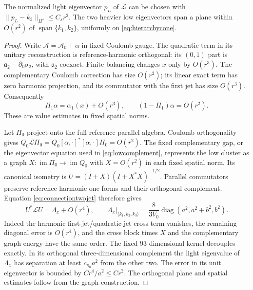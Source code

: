 \begin{lemma}\label{lem:lightdirection}
The normalized light eigenvector $p_L$ of $\mathcal L$ can be chosen with
$\|p_L-k_3\|_{H^s}\le C_s r^2$. The two heavier low eigenvectors span
a plane within $O(r^2)$ of $\operatorname{span}\{k_1,k_2\}$, uniformly
on \eqref{eq:hierarchycone}.
\end{lemma}
\begin{proof}
Write $\mathcal A=\mathcal A_0+\alpha$ in fixed Coulomb gauge. The
quadratic term in its unitary reconstruction is reference-harmonic
orthogonal: its $(0,1)$ part is $\mathfrak a_2-\bar\partial_0\sigma_2$,
with $\mathfrak a_2$ coexact. Finite balancing changes $x$ only by
$O(r^3)$. The complementary Coulomb correction has size $O(r^2)$;
its linear exact term has zero harmonic projection, and its commutator
with the first jet has size $O(r^3)$. Consequently
\begin{equation}\label{eq:connectiontwojet}
 \Pi_1\alpha=\alpha_1(x)+O(r^3),\qquad
 (1-\Pi_1)\alpha=O(r^2).
\end{equation}
These are value estimates in fixed spatial norms.

Let $\Pi_0$ project onto the full reference parallel algebra. Coulomb
orthogonality gives
$Q_0\mathcal L\Pi_0=Q_0[\alpha,\cdot]^*[\alpha,\cdot]\Pi_0=O(r^2)$.
The fixed complementary gap, or the eigenvector equation used in
\eqref{eq:lowcomplement}, represents the low cluster as a graph
$X:\operatorname{im}\Pi_0\to\operatorname{im}Q_0$ with
$X=O(r^2)$ in each fixed spatial norm. Its canonical isometry is
$U=(I+X)(I+X^*X)^{-1/2}$. Parallel commutators preserve reference
harmonic one-forms and their orthogonal complement. Equation
\eqref{eq:connectiontwojet} therefore gives
\begin{equation}\label{eq:effectivepauli}
 U^*\mathcal LU=\Lambda_x+O(r^4),\qquad
 \Lambda_x\big|_{\langle k_1,k_2,k_3\rangle}
 =\frac8{3V_0}\operatorname{diag}(a^2,a^2+b^2,b^2).
\end{equation}
Indeed the harmonic first-jet/quadratic-jet cross term vanishes, the
remaining diagonal error is $O(r^4)$, and the cross block times $X$
and the complementary graph energy have the same order.
The fixed 93-dimensional kernel decouples exactly. In its orthogonal
three-dimensional complement the light eigenvalue of $\Lambda_x$ has
separation at least $c_{\kappa_0}a^2$ from the other two. The error in
its unit eigenvector is bounded by $Cr^4/a^2\le Cr^2$. The orthogonal
plane and spatial estimates follow from the graph construction.
\end{proof}

